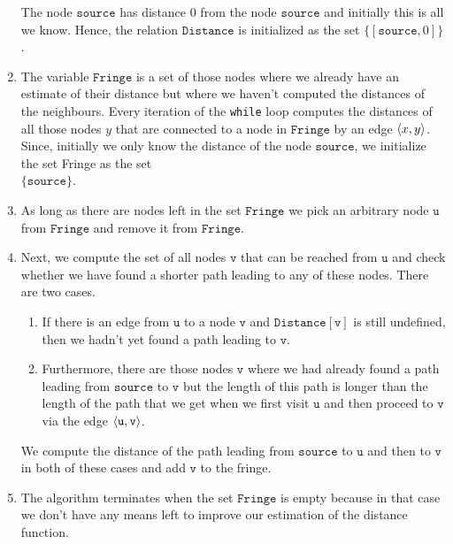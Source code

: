 \begin{enumerate}
      The node $\mathtt{source}$ has distance $0$ from the node $\mathtt{source}$ and initially this is
      all we know.  Hence, the relation $\mathtt{Distance}$ is initialized as the set $\{[\mathtt{source},0]\}$.
\item The variable $\mathtt{Fringe}$ is a set of those nodes where we already have an estimate of
      their distance but where we haven't computed the distances of the neighbours.
      Every iteration of the \texttt{while} loop computes the distances of all those nodes $y$ that are
      connected to a node in $\mathtt{Fringe}$ by an edge $\pair(x,y)$.
      Since, initially we only know the distance of the node $\mathtt{source}$, we initialize the set
      Fringe as the set
      \\[0.2cm]
      \hspace*{1.3cm}
      $\{ \mathtt{source} \}$.
\item As long as there are nodes left in the set $\mathtt{Fringe}$ we pick an arbitrary node
      $\mathtt{u}$ from $\mathtt{Fringe}$ and remove it from $\mathtt{Fringe}$. 
\item Next, we compute the set of all nodes $\mathtt{v}$ that can be reached from $\mathtt{u}$ and check whether we
      have found a shorter path leading to any of these nodes.  There are two cases.
      \begin{enumerate}
      \item If there is an edge from $\mathtt{u}$ to a node $\mathtt{v}$ and  $\mathtt{Distance}[\mathtt{v}]$ is still
            undefined, then we hadn't yet found a path leading to $\mathtt{v}$.
      \item Furthermore, there are those nodes $\mathtt{v}$ where we had already found a path leading from
            $\mathtt{source}$ to $\mathtt{v}$ but the length of this path is longer than the length of the path
            that we get when we first visit $\mathtt{u}$ and then proceed to $\mathtt{v}$ via the edge $\pair(\mathtt{u},\mathtt{v})$.
      \end{enumerate}
      We compute the distance of the path leading from $\mathtt{source}$ to $\mathtt{u}$ and then to
      $\mathtt{v}$ in both of these cases and add $\mathtt{v}$ to the fringe.
\item The algorithm terminates when the set $\mathtt{Fringe}$ is empty because in that case we don't
      have any means left to improve our estimation of the distance function.
\end{enumerate}

